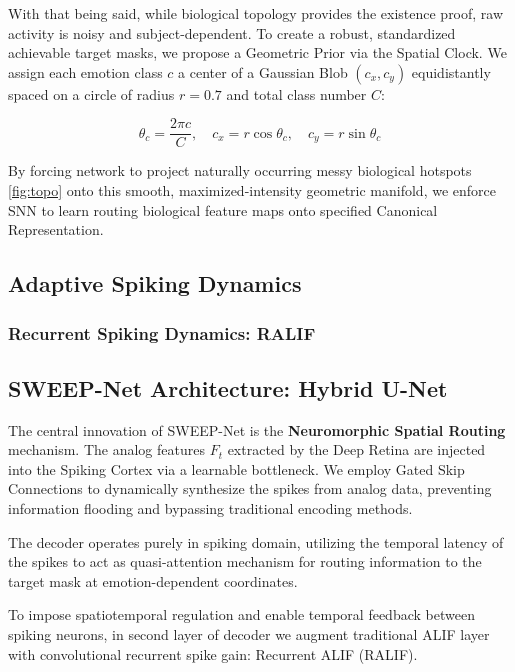 \documentclass[conference]{IEEEtran}
\begin{document}
With that being said, while biological topology provides the existence proof, raw activity is noisy and subject-dependent. To create a robust, standardized achievable target masks, we propose a Geometric Prior via the Spatial Clock. We assign each emotion class $c$ a center of a Gaussian Blob $(c_x, c_y)$ equidistantly spaced on a circle of radius $r = 0.7$ and total class number $C$:

\begin{equation}
\theta_c = \frac{2\pi c}{C}, \quad c_x = r \cos \theta_c, \quad c_y = r \sin \theta_c
\end{equation}

By forcing network to project naturally occurring messy biological hotspots \ref{fig:topo} onto this smooth, maximized-intensity geometric manifold, we enforce SNN to learn routing biological feature maps onto specified Canonical Representation.

\subsection{Adaptive Spiking Dynamics} %

\subsubsection{Recurrent Spiking Dynamics: RALIF} 


\subsection{SWEEP-Net Architecture: Hybrid U-Net}

The central innovation of SWEEP-Net is the \textbf{Neuromorphic Spatial Routing} mechanism. The analog features $F_t$ extracted by the Deep Retina are injected into the Spiking Cortex via a learnable bottleneck. We employ Gated Skip Connections \cite{Oktay2018} to dynamically synthesize the spikes from analog data, preventing information flooding and bypassing traditional encoding methods.

The decoder operates purely in spiking domain, utilizing the temporal latency of the spikes to act as quasi-attention mechanism for routing information to the target mask at emotion-dependent coordinates. 

To impose spatiotemporal regulation and enable temporal feedback between spiking neurons, in second layer of decoder we augment traditional ALIF layer with convolutional recurrent spike gain: Recurrent ALIF (RALIF).
\end{document}
